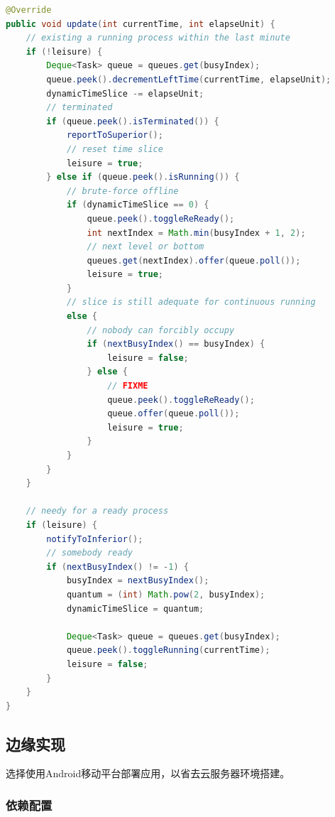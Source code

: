 \documentclass[UTF8]{ctexart}
\begin{document}
\begin{lstlisting}[language={java},caption={多级反馈队列（抢占式调度）}]
@Override
public void update(int currentTime, int elapseUnit) {
    // existing a running process within the last minute
    if (!leisure) {
        Deque<Task> queue = queues.get(busyIndex);
        queue.peek().decrementLeftTime(currentTime, elapseUnit);
        dynamicTimeSlice -= elapseUnit;
        // terminated
        if (queue.peek().isTerminated()) {
            reportToSuperior();
            // reset time slice
            leisure = true;
        } else if (queue.peek().isRunning()) {
            // brute-force offline
            if (dynamicTimeSlice == 0) {
                queue.peek().toggleReReady();
                int nextIndex = Math.min(busyIndex + 1, 2);
                // next level or bottom
                queues.get(nextIndex).offer(queue.poll());
                leisure = true;
            }
            // slice is still adequate for continuous running
            else {
                // nobody can forcibly occupy
                if (nextBusyIndex() == busyIndex) {
                    leisure = false;
                } else {
                    // FIXME
                    queue.peek().toggleReReady();
                    queue.offer(queue.poll());
                    leisure = true;
                }
            }
        }
    }

    // needy for a ready process
    if (leisure) {
        notifyToInferior();
        // somebody ready
        if (nextBusyIndex() != -1) {
            busyIndex = nextBusyIndex();
            quantum = (int) Math.pow(2, busyIndex);
            dynamicTimeSlice = quantum;

            Deque<Task> queue = queues.get(busyIndex);
            queue.peek().toggleRunning(currentTime);
            leisure = false;
        }
    }
}
\end{lstlisting}

\subsection{边缘实现}

选择使用Android移动平台部署应用，以省去云服务器环境搭建。

\subsubsection{依赖配置}
\end{document}
